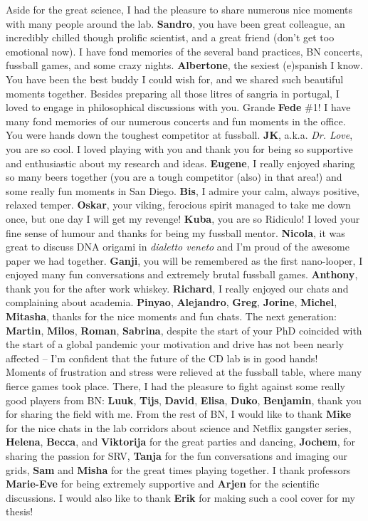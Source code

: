\noindent Aside for the great science, I had the pleasure to share numerous nice moments with many people around the lab. \textbf{Sandro}, you have been great colleague, an incredibly chilled though prolific scientist, and a great friend (don't get too emotional now). I have fond memories of the several band practices, BN concerts, fussball games, and some crazy nights. \textbf{Albertone}, the sexiest (e)spanish I know. You have been the best buddy I could wish for, and we shared such beautiful moments together. Besides preparing all those litres of sangria in portugal, I loved to engage in philosophical discussions with you. Grande \textbf{Fede} \#1! I have many fond memories of our numerous concerts and fun moments in the office. You were hands down the toughest competitor at fussball. \textbf{JK}, a.k.a. \emph{Dr. Love}, you are so cool. I loved playing with you and thank you for being so supportive and enthusiastic about my research and ideas. \textbf{Eugene}, I really enjoyed sharing so many beers together (you are a tough competitor (also) in that area!) and some really fun moments in San Diego. \textbf{Bis}, I admire your calm, always positive, relaxed temper. \textbf{Oskar}, your viking, ferocious spirit managed to take me down once, but one day I will get my revenge! \textbf{Kuba}, you are so Ridiculo! I loved your fine sense of humour and thanks for being my fussball mentor. \textbf{Nicola}, it was great to discuss DNA origami in \emph{dialetto veneto} and I'm proud of the awesome paper we had together. \textbf{Ganji}, you will be remembered as the first nano-looper, I enjoyed many fun conversations and extremely brutal fussball games. \textbf{Anthony}, thank you for the after work whiskey. \textbf{Richard}, I really enjoyed our chats and complaining about academia. \textbf{Pinyao}, \textbf{Alejandro}, \textbf{Greg}, \textbf{Jorine}, \textbf{Michel}, \textbf{Mitasha}, thanks for the nice moments and fun chats. The next generation: \textbf{Martin}, \textbf{Milos}, \textbf{Roman}, \textbf{Sabrina}, despite the start of your PhD coincided with the start of a global pandemic your motivation and drive has not been nearly affected – I'm confident that the future of the CD lab is in good hands!\\[0.5pt]

\noindent Moments of frustration and stress were relieved at the fussball table, where many fierce games took place. There, I had the pleasure to fight against some really good players from BN: \textbf{Luuk}, \textbf{Tijs}, \textbf{David}, \textbf{Elisa}, \textbf{Duko}, \textbf{Benjamin}, thank you for sharing the field with me. From the rest of BN, I would like to thank \textbf{Mike} for the nice chats in the lab corridors about science and Netflix gangster series, \textbf{Helena}, \textbf{Becca}, and \textbf{Viktorija} for the great parties and dancing, \textbf{Jochem}, for sharing the passion for SRV, \textbf{Tanja} for the fun conversations and imaging our grids, \textbf{Sam} and \textbf{Misha} for the great times playing together. I thank professors \textbf{Marie-Eve} for being extremely supportive and \textbf{Arjen} for the scientific discussions. I would also like to thank \textbf{Erik} for making such a cool cover for my thesis!\\[0.5pt]

